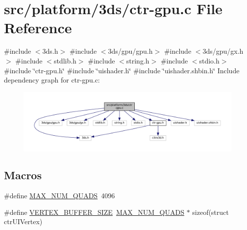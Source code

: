 \hypertarget{ctr-gpu_8c}{}\section{src/platform/3ds/ctr-\/gpu.c File Reference}
\label{ctr-gpu_8c}
{\ttfamily \#include $<$3ds.\+h$>$}\newline
{\ttfamily \#include $<$3ds/gpu/gpu.\+h$>$}\newline
{\ttfamily \#include $<$3ds/gpu/gx.\+h$>$}\newline
{\ttfamily \#include $<$stdlib.\+h$>$}\newline
{\ttfamily \#include $<$string.\+h$>$}\newline
{\ttfamily \#include $<$stdio.\+h$>$}\newline
{\ttfamily \#include \char`\"{}ctr-\/gpu.\+h\char`\"{}}\newline
{\ttfamily \#include \char`\"{}uishader.\+h\char`\"{}}\newline
{\ttfamily \#include \char`\"{}uishader.\+shbin.\+h\char`\"{}}\newline
Include dependency graph for ctr-\/gpu.c\+:
\nopagebreak
\begin{figure}[H]
\begin{center}
\leavevmode
\includegraphics[width=350pt]{ctr-gpu_8c__incl}
\end{center}
\end{figure}
\subsection*{Macros}
\begin{DoxyCompactItemize}
\item 
\#define \mbox{\hyperlink{ctr-gpu_8c_abc64108591f9acfd3372e681cbfc87e8}{M\+A\+X\+\_\+\+N\+U\+M\+\_\+\+Q\+U\+A\+DS}}~4096
\item 
\#define \mbox{\hyperlink{ctr-gpu_8c_a01266cb36304dd97647db181b5eac6f7}{V\+E\+R\+T\+E\+X\+\_\+\+B\+U\+F\+F\+E\+R\+\_\+\+S\+I\+ZE}}~\mbox{\hyperlink{ctr-gpu_8c_abc64108591f9acfd3372e681cbfc87e8}{M\+A\+X\+\_\+\+N\+U\+M\+\_\+\+Q\+U\+A\+DS}} $\ast$ sizeof(struct ctr\+U\+I\+Vertex)
\end{DoxyCompactItemize}

